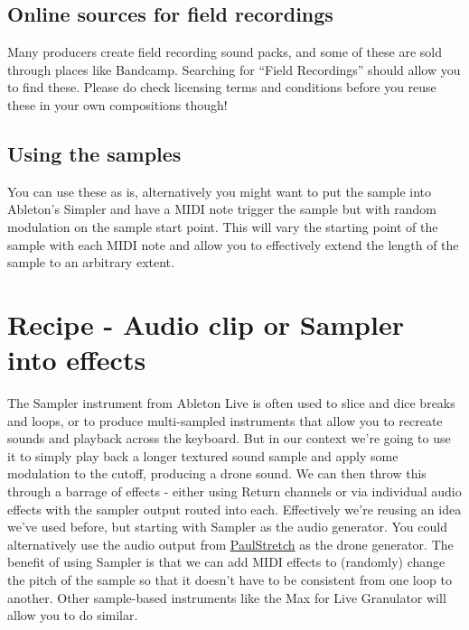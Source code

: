 \documentclass[
  12pt,
  letterpaper,
  oneside,
  open=any]{scrbook}
\begin{document}
\section{Online sources for field
recordings}\label{online-sources-for-field-recordings}

Many producers create field recording sound packs, and some of these are
sold through places like Bandcamp. Searching for ``Field Recordings''
should allow you to find these. Please do check licensing terms and
conditions before you reuse these in your own compositions though!

\section{Using the samples}\label{using-the-samples}

You can use these as is, alternatively you might want to put the sample
into Ableton's Simpler and have a MIDI note trigger the sample but with
random modulation on the sample start point. This will vary the starting
point of the sample with each MIDI note and allow you to effectively
extend the length of the sample to an arbitrary extent.


\chapter{Recipe - Audio clip or Sampler into
effects}\label{Chapter-020-Recipe-Sampler_drone}

The Sampler instrument from Ableton Live is often used to slice and dice
breaks and loops, or to produce multi-sampled instruments that allow you
to recreate sounds and playback across the keyboard. But in our context
we're going to use it to simply play back a longer textured sound sample
and apply some modulation to the cutoff, producing a drone sound. We can
then throw this through a barrage of effects - either using Return
channels or via individual audio effects with the sampler output routed
into each. Effectively we're reusing an idea we've used before, but
starting with Sampler as the audio generator. You could alternatively
use the audio output from
\hyperref[Chapter-016-Tools-PaulStretch]{PaulStretch} as the drone
generator. The benefit of using Sampler is that we can add MIDI effects
to (randomly) change the pitch of the sample so that it doesn't have to
be consistent from one loop to another. Other sample-based instruments
like the Max for Live Granulator will allow you to do similar.
\end{document}
